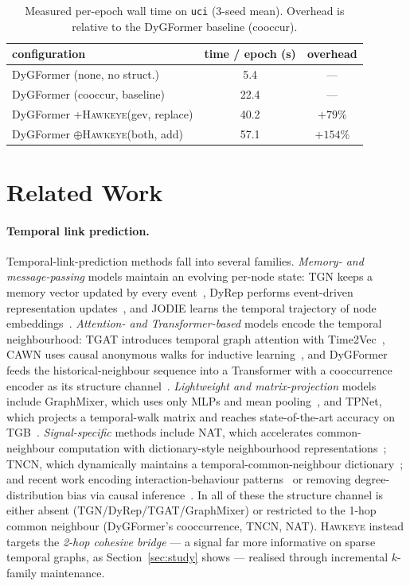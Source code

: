 \documentclass[sigconf,nonacm,review]{acmart}
\newcommand{\method}{\textsc{Hawkeye}\xspace}
\begin{document}
\begin{table}[t]
\caption{Measured per-epoch wall time on \texttt{uci} (3-seed mean). Overhead is
relative to the DyGFormer baseline (cooccur).}
\label{tab:overhead}
\centering\small
\setlength{\tabcolsep}{6pt}
\begin{tabular}{lcc}
\toprule
configuration & time / epoch (s) & overhead \\
\midrule
DyGFormer (none, no struct.)         & 5.4  & --- \\
DyGFormer (cooccur, baseline)        & 22.4 & --- \\
DyGFormer $+$\method (gev, replace)  & 40.2 & $+79\%$  \\
DyGFormer $\oplus$\method (both, add)& 57.1 & $+154\%$ \\
\bottomrule
\end{tabular}
\end{table}

\section{Related Work}
\label{sec:related}

\paragraph{Temporal link prediction.}
Temporal-link-prediction methods fall into several families. \emph{Memory- and
message-passing} models maintain an evolving per-node state: TGN keeps a memory
vector updated by every event~\cite{rossi2020tgn}, DyRep performs event-driven
representation updates~\cite{trivedi2019dyrep}, and JODIE learns the temporal
trajectory of node embeddings~\cite{kumar2019jodie}. \emph{Attention- and
Transformer-based} models encode the temporal neighbourhood: TGAT introduces
temporal graph attention with Time2Vec~\cite{kazemi2019time2vec,xu2020tgat}, CAWN uses causal anonymous walks
for inductive learning~\cite{wang2021cawn}, and DyGFormer feeds the
historical-neighbour sequence into a Transformer with a cooccurrence encoder as
its structure channel~\cite{yu2023dygformer}. \emph{Lightweight and
matrix-projection} models include GraphMixer, which uses only MLPs and mean
pooling~\cite{cong2023graphmixer}, and TPNet, which projects a temporal-walk
matrix and reaches state-of-the-art accuracy on TGB~\cite{lu2024tpnet}.
\emph{Signal-specific} methods include NAT, which accelerates common-neighbour
computation with dictionary-style neighbourhood representations~\cite{luo2022nat};
TNCN, which dynamically maintains a temporal-common-neighbour
dictionary~\cite{zhang2024tncn}; and recent work encoding interaction-behaviour
patterns~\cite{zhang2025ipnet} or removing degree-distribution bias via causal
inference~\cite{zhang2025tide}. In all of these the structure channel is either
absent (TGN/DyRep/TGAT/GraphMixer) or restricted to the 1-hop common neighbour
(DyGFormer's cooccurrence, TNCN, NAT). \method instead targets the \emph{2-hop
cohesive bridge} --- a signal far more informative on sparse temporal graphs,
as Section~\ref{sec:study} shows --- realised through incremental $k$-family
maintenance.
\end{document}
